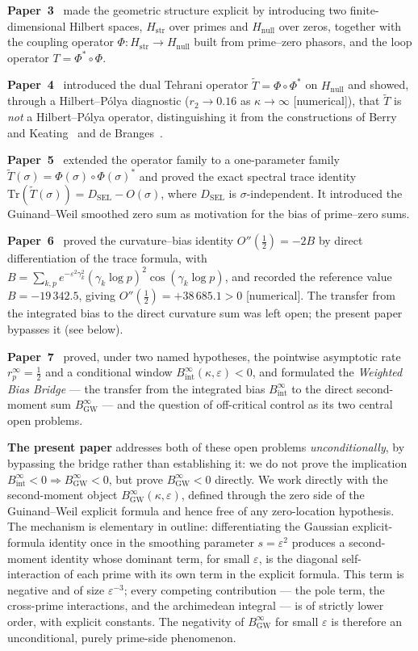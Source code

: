 \documentclass[11pt]{article}
\newcommand{\Hstr}{H_{\mathrm{str}}}
\newcommand{\Hnull}{H_{\mathrm{null}}}
\newcommand{\Tt}{\widetilde{T}}
\newcommand{\DSEL}{D_{\mathrm{SEL}}}
\newcommand{\BinfGW}{B_{\mathrm{GW}}^{\infty}}   %
\begin{document}
\textbf{Paper~3}~\cite{Paper3} made the geometric structure explicit by
introducing two finite-dimensional Hilbert spaces, $\Hstr$ over primes and
$\Hnull$ over zeros, together with the coupling operator
$\Phi:\Hstr\to\Hnull$ built from prime--zero phasors, and the loop
operator $T=\Phi^*\circ\Phi$.

\textbf{Paper~4}~\cite{Paper4} introduced the dual Tehrani operator
$\Tt=\Phi\circ\Phi^*$ on $\Hnull$ and showed, through a
Hilbert--P\'olya diagnostic ($r_2\to 0.16$ as $\kappa\to\infty$
[numerical]), that $\Tt$ is \emph{not} a Hilbert--P\'olya operator,
distinguishing it from the constructions of Berry and
Keating~\cite{BerryKeating} and de Branges~\cite{deBranges}.

\textbf{Paper~5}~\cite{Paper5} extended the operator family to a
one-parameter family $\Tt(\sigma)=\Phi(\sigma)\circ\Phi(\sigma)^*$ and
proved the exact spectral trace identity
$\mathrm{Tr}(\Tt(\sigma))=\DSEL-O(\sigma)$, where $\DSEL$ is
$\sigma$-independent.
It introduced the Guinand--Weil smoothed zero sum as motivation for the
bias of prime--zero sums.

\textbf{Paper~6}~\cite{Paper6} proved the curvature--bias identity
$O''(\tfrac12)=-2B$ by direct differentiation of the trace formula, with
$B=\sum_{k,p}e^{-\varepsilon^2\gamma_k^2}(\gamma_k\log p)^2
\cos(\gamma_k\log p)$, and recorded the reference value $B=-19\,342.5$,
giving $O''(\tfrac12)=+38\,685.1>0$ [numerical].
The transfer from the integrated bias to the direct curvature sum was left
open; the present paper bypasses it (see below).

\textbf{Paper~7}~\cite{Paper7} proved, under two named hypotheses, the
pointwise asymptotic rate $r_p^\infty=\tfrac12$ and a conditional window
$B_{\mathrm{int}}^\infty(\kappa,\varepsilon)<0$, and formulated the
\emph{Weighted Bias Bridge} --- the transfer from the integrated bias
$B_{\mathrm{int}}^\infty$ to the direct second-moment sum $\BinfGW$ --- and
the question of off-critical control as its two central open problems.

\smallskip
\textbf{The present paper} addresses both of these open problems
\emph{unconditionally}, by bypassing the bridge rather than establishing it:
we do not prove the implication
$B_{\mathrm{int}}^\infty<0\Rightarrow\BinfGW<0$, but prove $\BinfGW<0$
directly.
We work directly with the second-moment object $\BinfGW(\kappa,\varepsilon)$,
defined through the zero side of the Guinand--Weil explicit formula and
hence free of any zero-location hypothesis.
The mechanism is elementary in outline: differentiating the Gaussian
explicit-formula identity once in the smoothing parameter $s=\varepsilon^2$
produces a second-moment identity whose dominant term, for small
$\varepsilon$, is the diagonal self-interaction of each prime with its own
term in the explicit formula.
This term is negative and of size $\varepsilon^{-3}$; every competing
contribution --- the pole term, the cross-prime interactions, and the
archimedean integral --- is of strictly lower order, with explicit
constants.
The negativity of $\BinfGW$ for small $\varepsilon$ is therefore an
unconditional, purely prime-side phenomenon.
\end{document}
